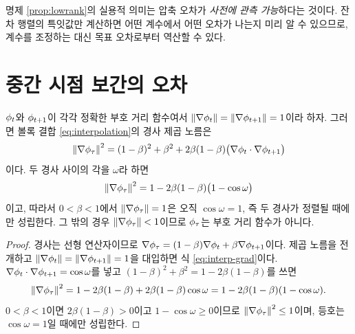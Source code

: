 명제 \ref{prop:lowrank}의 실용적 의미는 압축 오차가 \emph{사전에 관측 가능}하다는
것이다. 잔차 행렬의 특잇값만 계산하면 어떤 계수에서 어떤 오차가 나는지 미리 알 수
있으므로, 계수를 조정하는 대신 목표 오차로부터 역산할 수 있다.


\section{중간 시점 보간의 오차}
\label{sec:interp-error}

\begin{proposition}
\label{prop:interp-eikonal}
$\phi_t$와 $\phi_{t+1}$이 각각 정확한 부호 거리 함수여서
$\left\lVert \nabla\phi_t \right\rVert=\left\lVert \nabla\phi_{t+1} \right\rVert=1$이라 하자. 그러면 볼록 결합
\eqref{eq:interpolation}의 경사 제곱 노름은
\begin{equation}
  \left\lVert \nabla\phi_\tau \right\rVert^2
  = (1-\beta)^2 + \beta^2 + 2\beta(1-\beta)\bigl(\nabla\phi_t\cdot\nabla\phi_{t+1}\bigr)
  \label{eq:interp-grad}
\end{equation}
이다. 두 경사 사이의 각을 $\omega$라 하면
\begin{equation}
  \left\lVert \nabla\phi_\tau \right\rVert^2 = 1 - 2\beta(1-\beta)\bigl(1-\cos\omega\bigr)
  \label{eq:interp-eikonal}
\end{equation}
이고, 따라서 $0<\beta<1$에서 $\left\lVert \nabla\phi_\tau \right\rVert=1$은 오직 $\cos\omega=1$, 즉 두
경사가 정렬될 때에만 성립한다. 그 밖의 경우 $\left\lVert \nabla\phi_\tau \right\rVert<1$이므로
$\phi_\tau$는 부호 거리 함수가 아니다.
\end{proposition}

\begin{proof}
경사는 선형 연산자이므로
$\nabla\phi_\tau = (1-\beta)\nabla\phi_t + \beta\nabla\phi_{t+1}$이다. 제곱 노름을
전개하고 $\left\lVert \nabla\phi_t \right\rVert=\left\lVert \nabla\phi_{t+1} \right\rVert=1$을 대입하면 식
\eqref{eq:interp-grad}이다. $\nabla\phi_t\cdot\nabla\phi_{t+1}=\cos\omega$를 넣고
$(1-\beta)^2+\beta^2 = 1-2\beta(1-\beta)$를 쓰면
\[
  \left\lVert \nabla\phi_\tau \right\rVert^2
  = 1 - 2\beta(1-\beta) + 2\beta(1-\beta)\cos\omega
  = 1 - 2\beta(1-\beta)(1-\cos\omega).
\]
$0<\beta<1$이면 $2\beta(1-\beta)>0$이고 $1-\cos\omega\ge0$이므로
$\left\lVert \nabla\phi_\tau \right\rVert^2\le1$이며, 등호는 $\cos\omega=1$일 때에만 성립한다.
\end{proof}

